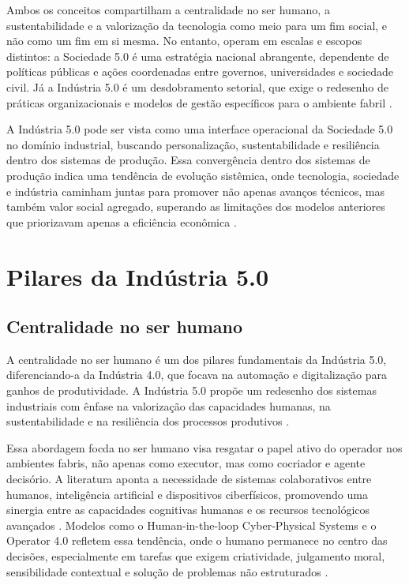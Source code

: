 Ambos os conceitos compartilham a centralidade no ser humano, a sustentabilidade e a valorização da tecnologia como meio para um fim social, e não como um fim em si mesma. No entanto, operam em escalas e escopos distintos: a Sociedade 5.0 é uma estratégia nacional abrangente, dependente de políticas públicas e ações coordenadas entre governos, universidades e sociedade civil. Já a Indústria 5.0 é um desdobramento setorial, que exige o redesenho de práticas organizacionais e modelos de gestão específicos para o ambiente fabril \cite{PIZON2023, TOTH2023}.

A Indústria 5.0 pode ser vista como uma interface operacional da Sociedade 5.0 no domínio industrial, buscando personalização, sustentabilidade e resiliência dentro dos sistemas de produção. Essa convergência dentro dos sistemas de produção indica uma tendência de evolução sistêmica, onde tecnologia, sociedade e indústria caminham juntas para promover não apenas avanços técnicos, mas também valor social agregado, superando as limitações dos modelos anteriores que priorizavam apenas a eficiência econômica \cite{VALETTE2023}.

\section{Pilares da Indústria 5.0}
\subsection{Centralidade no ser humano}

A centralidade no ser humano é um dos pilares fundamentais da Indústria 5.0, diferenciando-a da Indústria 4.0, que focava na automação e digitalização para ganhos de produtividade. A Indústria 5.0 propõe um redesenho dos sistemas industriais com ênfase na valorização das capacidades humanas, na sustentabilidade e na resiliência dos processos produtivos \cite{VALETTE2023, euCommission2021}.

Essa abordagem focda no ser humano visa resgatar o papel ativo do operador nos ambientes fabris, não apenas como executor, mas como cocriador e agente decisório. A literatura aponta a necessidade de sistemas colaborativos entre humanos, inteligência artificial e dispositivos ciberfísicos, promovendo uma sinergia entre as capacidades cognitivas humanas e os recursos tecnológicos avançados \cite{TOTH2023, Santana_2023}. Modelos como o Human-in-the-loop Cyber-Physical Systems e o Operator 4.0 refletem essa tendência, onde o humano permanece no centro das decisões, especialmente em tarefas que exigem criatividade, julgamento moral, sensibilidade contextual e solução de problemas não estruturados \cite{VALETTE2023, RANNERTSHAUSER2022}.

